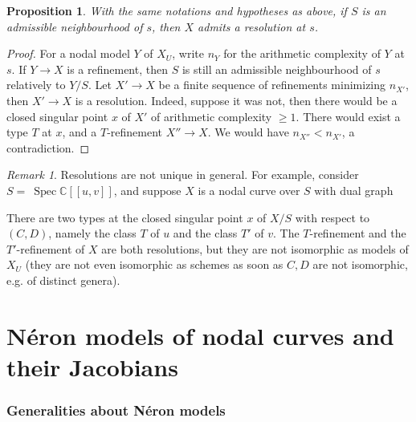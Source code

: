 \documentclass[a4paper,12pt]{amsart} %
\numberwithin{equation}{subsection}
\newcommand{\Spec}{\operatorname{Spec}}
\theoremstyle{definition}
\theoremstyle{plain}%
\newtheorem{proposition}[definition]{Proposition}
\theoremstyle{remark}
\newtheorem{remark}[definition]{Remark}
\begin{document}
\begin{proposition}\label{proposition existence des resolutions}
	With the same notations and hypotheses as above, if $S$ is an admissible neighbourhood of $s$, then $X$ admits a resolution at $s$.
\end{proposition}

\begin{proof}
For a nodal model $Y$ of $X_U$, write $n_Y$ for the arithmetic complexity of $Y$ at $s$. If $Y \to X$ is a refinement, then $S$ is still an admissible neighbourhood of $s$ relatively to $Y/S$. Let $X'\to X$ be a finite sequence of refinements minimizing $n_{X'}$, then $X'\to X$ is a resolution. Indeed, suppose it was not, then there would be a closed singular point $x$ of $X'$ of arithmetic complexity $\geq 1$. There would exist a type $T$ at $x$, and a $T$-refinement $X''\to X$. We would have $n_{X''}<n_{X'}$, a contradiction.
\end{proof}

\begin{remark}
Resolutions are not unique in general. For example, consider $S=~\Spec\mathbb{C}[[u,v]]$, and suppose $X$ is a nodal curve over $S$ with dual graph

\begin{center}
\end{center}

There are two types at the closed singular point $x$ of $X/S$ with respect to $(C,D)$, namely the class $T$ of $u$ and the class $T'$ of $v$. The $T$-refinement and the $T'$-refinement of $X$ are both resolutions, but they are not isomorphic as models of $X_U$ (they are not even isomorphic as schemes as soon as $C,D$ are not isomorphic, e.g. of distinct genera).
\end{remark}


\part{N\'eron models of nodal curves and their Jacobians}\label{part2}

\section{Generalities about N\'eron models}\label{Generalities_about_NMs}
\end{document}
